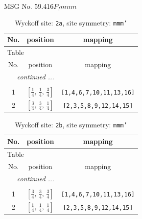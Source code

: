 \documentclass[fleqn,8pt]{jsarticle}
\begin{document}
\setcounter{MaxMatrixCols}{32}

\renewcommand{\tablename}{Table~}
\renewcommand{\figurename}{Figure~}
\begin{center}
\LARGE
MSG No. 59.416\quad$P_{I}mmn$
\end{center}
\renewcommand{\arraystretch}{1.2}
\begin{longtable}{ccc}
\caption{Wyckoff site: {\tt 2a}, site symmetry: {\tt mmm'}}
 \\
 \hline \hline
No. & position & mapping \\ \hline \endfirsthead

\multicolumn{2}{l}{\tablename\ \thetable{}} \\
 \hline \hline
No. & position & mapping \\ \hline \endhead

 \hline \hline
\multicolumn{2}{r}{\footnotesize\it continued ...} \\ \endfoot

 \hline \hline
\multicolumn{2}{r}{} \\ \endlastfoot

1 & $\left[ \frac{1}{4},\, \frac{1}{4},\, \frac{3}{4} \right]$ & {\tt [1,4,6,7,10,11,13,16]} \\ \hline
2 & $\left[ \frac{3}{4},\, \frac{3}{4},\, \frac{1}{4} \right]$ & {\tt [2,3,5,8,9,12,14,15]} \\
\end{longtable}
\renewcommand{\arraystretch}{1.2}
\begin{longtable}{ccc}
\caption{Wyckoff site: {\tt 2b}, site symmetry: {\tt mmm'}}
 \\
 \hline \hline
No. & position & mapping \\ \hline \endfirsthead

\multicolumn{2}{l}{\tablename\ \thetable{}} \\
 \hline \hline
No. & position & mapping \\ \hline \endhead

 \hline \hline
\multicolumn{2}{r}{\footnotesize\it continued ...} \\ \endfoot

 \hline \hline
\multicolumn{2}{r}{} \\ \endlastfoot

1 & $\left[ \frac{3}{4},\, \frac{3}{4},\, \frac{3}{4} \right]$ & {\tt [1,4,6,7,10,11,13,16]} \\ \hline
2 & $\left[ \frac{1}{4},\, \frac{1}{4},\, \frac{1}{4} \right]$ & {\tt [2,3,5,8,9,12,14,15]} \\
\end{longtable}
\end{document}
